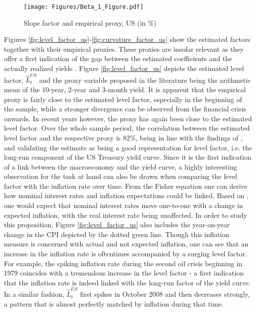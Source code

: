 \begin{figure}[!t]
    \centering
    \texttt{[image: Figures/Beta\_1\_Figure.pdf]}
    \caption{Slope factor and empirical proxy, US (in \%)}
    \label{fig:slope_factor_us}
\end{figure}

Figures \ref{fig:level_factor_us}-\ref{fig:curvature_factor_us} show the estimated factors together with their empirical proxies. 
These proxies are insofar relevant as they offer a first indication of the gap between the estimated coefficients and the actually realized yields \citep{kanjilal2011macroeconomic}.
Figure \ref{fig:level_factor_us} depicts the estimated level factor, $\hat{L}^{US}_{t}$ and the proxy variable proposed in the literature being the arithmetic mean of the 10-year, 2-year and 3-month yield. 
It is apparent that the empirical proxy is fairly close to the estimated level factor, especially in the beginning of the sample, while a stronger divergence can be observed from the financial crisis onwards.
In recent years however, the proxy has again been close to the estimated level factor. 
Over the whole sample period, the correlation between the estimated level factor and the respective proxy is 82\%, being in line with the findings of \citet{diebold2006macroeconomy}, and validating the estimate as being a good representation for level factor, i.e. the long-run component of the US Treasury yield curve. 
Since it is the first indication of a link between the macroeconomy and the yield curve, a highly interesting observation for the task at hand can also be drawn when comparing the level factor with the inflation rate over time. 
From the Fisher equation one can derive how nominal interest rates and inflation expectations could be linked. 
Based on \citet{fisher1930theory}, one would expect that nominal interest rates move one-to-one with a change in expected inflation, with the real interest rate being unaffected. 
In order to study this proposition, Figure \ref{fig:level_factor_us} also includes the year-on-year change in the CPI depicted by the dotted green line.
Though this inflation measure is concerned with actual and not expected inflation, one can see that an increase in the inflation rate is oftentimes accompanied by a surging level factor. For example, the spiking inflation rate during the second oil crisis beginning in 1979 coincides with a tremendous increase in the level factor - a first indication that the inflation rate is indeed linked with the long-run factor of the yield curve. In a similar fashion, $\hat{L}^{US}_{t}$ first spikes in October 2008 and then decreases strongly, a pattern that is almost perfectly matched by inflation during that time. 
